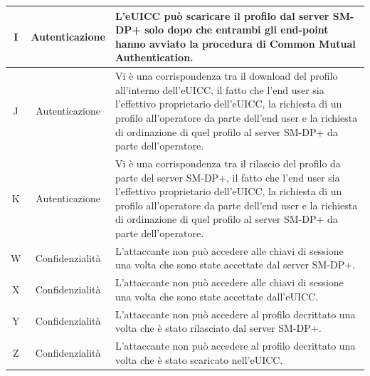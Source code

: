 \documentclass[10pt, oneside]{book}
\begin{document}
\begin{table}[h!]
\begin{center}
\begin{tabularx}{\textwidth}{|c|c|X|}
\hline
I & Autenticazione & L'eUICC può scaricare il profilo dal server SM-DP+ solo dopo che entrambi gli end-point hanno avviato la procedura di Common Mutual Authentication.\\
\hline
J & Autenticazione & Vi è una corrispondenza tra il download del profilo all'interno dell'eUICC, il fatto che l'end user sia l'effettivo proprietario dell'eUICC, la richiesta di un profilo all'operatore da parte dell'end user e la richiesta di ordinazione di quel profilo al server SM-DP+ da parte dell'operatore.\\
\hline
K & Autenticazione & Vi è una corrispondenza tra il rilascio del profilo da parte del server SM-DP+, il fatto che l'end user sia l'effettivo proprietario dell'eUICC, la richiesta di un profilo all'operatore da parte dell'end user e la richiesta di ordinazione di quel profilo al server SM-DP+ da parte dell'operatore.\\
\hline
W & Confidenzialità & L'attaccante non può accedere alle chiavi di sessione una volta che sono state accettate dal server SM-DP+.\\
\hline
X & Confidenzialità & L'attaccante non può accedere alle chiavi di sessione una volta che sono state accettate dall'eUICC.\\
\hline
Y & Confidenzialità & L'attaccante non può accedere al profilo decrittato una volta che è stato rilasciato dal server SM-DP+.\\
\hline
Z & Confidenzialità & L'attaccante non può accedere al profilo decrittato una volta che è stato scaricato nell'eUICC.\\
\hline
\end{tabularx}
\end{center}
\end{table}
\end{document}
